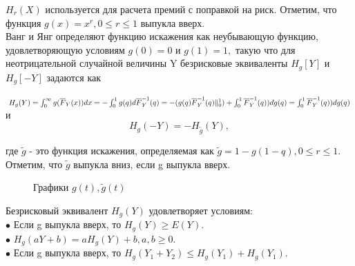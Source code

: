 \documentclass[12pt,a4paper]{article}
\begin{document}
 $H_{r}(X)$ используется для расчета премий с поправкой на риск. Отметим, что функция $g(x)= x^{r}, 0 \leq r \leq 1$ выпукла вверх.\\
 
 Ванг и Янг определяют функцию искажения как неубывающую функцию, удовлетворяющую условиям  $g(0)=0$ и $g(1)=1,$  такую что для неотрицательной случайной величины Y безрисковые эквиваленты  
 $ H_{g} \left[ Y \right] $ и $ H_{g} \left[ -Y \right] $   задаются как 
 
 $ H_{g}(Y) = \int^{\infty}_{0} g({\overline  F}_Y(x))dx 
 =  - \int_{0}^{1} g(q)d{\overline  F}^{-1}_Y(q) \\
 = - (g(q){\overline  F}^{-1}_Y(q) \|_{0}^{1}) + \int_{0}^{1} {\overline  F}^{-1}_Y(q))dg(q)
 =  \int_{0}^{1} {\overline  F}^{-1}_Y(q))dg(q)$\\
 
 
 и $$ H_{g} (-Y) = - H_{\tilde g} (Y),$$  
 
 где $\tilde g $ - это функция искажения, определяемая как $ \tilde g = 1 - g(1-q), 0 \leq r \leq 1.$\\
 
 Отметим, что  $\tilde g $ выпукла вниз, если g выпукла вверх.\\
 
   \begin{figure}[h!]
\caption{   Графики $g(t), \tilde g (t)  $ }
\label{fig:image}
\end{figure}

 
 
 
 Безрисковый эквивалент  $ H_{g}(Y) $ удовлетворяет условиям:\\
 
$\bullet$ Если g выпукла вверх, то  $ H_{g}(Y)  \geq E(Y).$\\
$\bullet$  $ H_{g}(aY+b) = a H_{g}(Y) + b, a,b \geq 0.$\\
$\bullet$ Если g выпукла вверх, то $ H_{g}(Y_1 + Y_2 )  \leq  H_{g}(Y_1)  + H_{g}(Y_1).$\\
 
\end{document}
